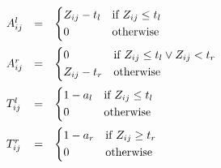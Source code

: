 \documentclass{article}
\begin{document}
\[
    \begin{array}{lll}
      A^l_{ij} &=&
          \begin{cases*}
              Z_{ij} - t_l & if $Z_{ij} \leq t_l$ \\
              0 & otherwise
          \end{cases*}
      \\[0.5cm]
      A^r_{ij} &=&
          \begin{cases*}
              0 & if $Z_{ij} \leq t_l \lor Z_{ij} < t_r$ \\
              Z_{ij} - t_r & otherwise
          \end{cases*}
      \\[0.5cm]
      T^l_{ij} &=&
          \begin{cases*}
              1 - a_l & if $Z_{ij} \leq t_l$ \\
              0 & otherwise
          \end{cases*}
      \\[0.5cm]
      T^r_{ij} &=&
          \begin{cases*}
              1 - a_r & if $Z_{ij} \geq t_r$ \\
              0 & otherwise
          \end{cases*}
    \end{array}
\]

\end{document}
